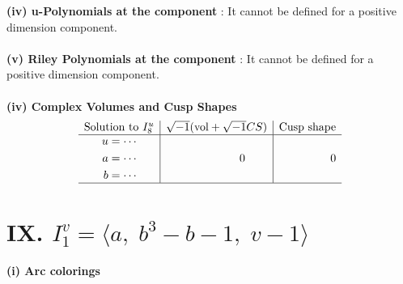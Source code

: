\documentclass[1p]{elsarticle_modified}
\theoremstyle{definition}
\newcommand{\I}{\sqrt{-1}}
\begin{document}
\flushleft \textbf{(iv) u-Polynomials at the component} : It cannot be defined for a positive dimension component.\\~\\
\flushleft \textbf{(v) Riley Polynomials at the component} : It cannot be defined for a positive dimension component.\\~\\
\newpage\flushleft \textbf{(iv) Complex Volumes and Cusp Shapes}
$$\begin{array}{c|c|c} 
\text{Solution to }I^u_{8}& \I (\text{vol} + \sqrt{-1}CS) & \text{Cusp shape}\\
 \hline 
\begin{aligned}
u &= \cdots \\
a &= \cdots \\
b &= \cdots\end{aligned}
 & \phantom{-0.000000 } 0 & \phantom{-0.000000 } 0\\
 \hline 
 \end{array}
$$\newpage\renewcommand{\arraystretch}{1}
\centering \section*{IX. $I^v_{1}= \langle a,\;b^3- b-1,\;v-1 \rangle$}
\flushleft \textbf{(i) Arc colorings}\\
\end{document}
